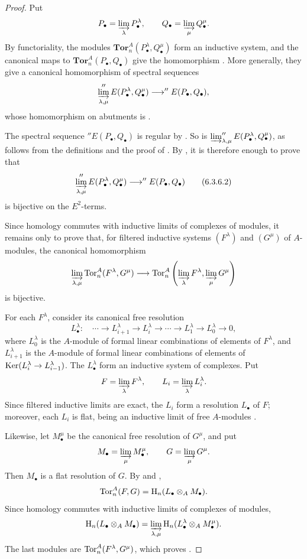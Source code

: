 \begin{proof}
Put
\[
  P_\bullet=\varinjlim_\lambda P_\bullet^\lambda,
  \qquad
  Q_\bullet=\varinjlim_\mu Q_\bullet^\mu.
\]
By functoriality, the modules
$\mathbf{Tor}_n^A(P_\bullet^\lambda,Q_\bullet^\mu)$ form an
inductive system, and
the canonical maps to
$\mathbf{Tor}_n^A(P_\bullet,Q_\bullet)$ give the homomorphism
.  More generally, they give a canonical
homomorphism of spectral sequences
\[
  \varinjlim_{\lambda,\mu}
  ''E(P_\bullet^\lambda,Q_\bullet^\mu)
  \longrightarrow
  ''E(P_\bullet,Q_\bullet),
\]
whose homomorphism on abutments is .

The spectral sequence $''E(P_\bullet,Q_\bullet)$ is regular by
.  So is
$\varinjlim_{\lambda,\mu}''E(P_\bullet^\lambda,Q_\bullet^\mu)$,
as follows from the definitions  and the proof
of .  By , it is therefore
enough to prove that
\[
  \varinjlim_{\lambda,\mu}
  ''E(P_\bullet^\lambda,Q_\bullet^\mu)
  \longrightarrow
  ''E(P_\bullet,Q_\bullet)
  \tag{6.3.6.2}\label{III.6.3.6.2}
\]
is bijective on the $E^2$-terms.

Since homology commutes with inductive limits of complexes of
modules, it remains only to prove that, for filtered inductive
systems $(F^\lambda)$ and $(G^\mu)$ of $A$-modules, the canonical
homomorphism
\[
  \varinjlim_{\lambda,\mu}\operatorname{Tor}_n^A(F^\lambda,G^\mu)
  \longrightarrow
  \operatorname{Tor}_n^A\left(
    \varinjlim_\lambda F^\lambda,
    \varinjlim_\mu G^\mu
  \right)
\]
is bijective.

For each $F^\lambda$, consider its canonical free resolution
\[
  L_\bullet^\lambda:\quad
  \cdots\longrightarrow L_{i+1}^\lambda
  \longrightarrow L_i^\lambda
  \longrightarrow\cdots\longrightarrow
  L_1^\lambda\longrightarrow L_0^\lambda\longrightarrow0,
\]
where $L_0^\lambda$ is the $A$-module of formal linear
combinations of elements of $F^\lambda$, and
$L_{i+1}^\lambda$ is the $A$-module of formal linear combinations
of elements of
$\operatorname{Ker}(L_i^\lambda\to L_{i-1}^\lambda)$.  The
$L_\bullet^\lambda$ form an inductive system of complexes.  Put
\[
  F=\varinjlim_\lambda F^\lambda,
  \qquad
  L_i=\varinjlim_\lambda L_i^\lambda.
\]
Since filtered inductive limits are exact, the $L_i$ form a
resolution $L_\bullet$ of $F$; moreover, each $L_i$ is flat, being
an inductive limit of free $A$-modules .

Likewise, let $M_\bullet^\mu$ be the canonical free resolution of
$G^\mu$, and put
\[
  M_\bullet=\varinjlim_\mu M_\bullet^\mu,
  \qquad
  G=\varinjlim_\mu G^\mu.
\]
Then $M_\bullet$ is a flat resolution of $G$.  By
 and ,
\[
  \operatorname{Tor}_n^A(F,G)=\mathrm{H}_n(L_\bullet\otimes_AM_\bullet).
\]
Since homology commutes with inductive limits of complexes of
modules,
\[
  \mathrm{H}_n(L_\bullet\otimes_AM_\bullet)
  =
  \varinjlim_{\lambda,\mu}
  \mathrm{H}_n(L_\bullet^\lambda\otimes_AM_\bullet^\mu).
\]
The last modules are $\operatorname{Tor}_n^A(F^\lambda,G^\mu)$, which proves
.


\end{proof}
